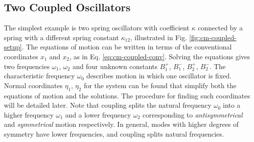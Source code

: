 \subsection{Two Coupled Oscillators}
The simplest example is two spring oscillators with coefficient $\kappa$ connected by a spring with a different spring constant $\kappa_{12}$, illustrated in Fig. \ref{fig:cm-coupled-setup}. The equations of motion can be written in terms of the conventional coordinates $x_1$ and $x_2$, as in Eq. \ref{eq:cm-coupled-conv}. Solving the equations gives two frequencies $\omega_1$, $\omega_2$ and four unknown constants $B_1^+$, $B_1^-$, $B_2^+$, $B_2^-$. The characteristic frequency $\omega_0$ describes motion in which one oscillator is fixed.
\\
\noindent Normal coordinates $\eta_1$, $\eta_2$ for the system can be found that simplify both the equations of motion and the solutions. The procedure for finding such coordinates will be detailed later. Note that coupling splits the natural frequency $\omega_0$ into a higher frequency $\omega_1$ and a lower frequency $\omega_2$ corresponding to \textit{antisymmetrical} and \textit{symmetrical} motion respectively. In general, modes with higher degrees of symmetry have lower frequencies, and coupling splits natural frequencies.
